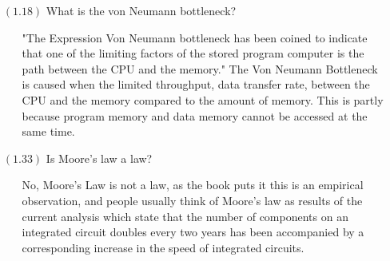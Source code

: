 \documentclass[letterpaper,12pt,titlepage]{article}
\begin{document}
\begin{enumerate}
\item[$(1.18)$]What is the von Neumann bottleneck?
  \begin{enumerate}
  \item[] "The Expression Von Neumann bottleneck has been coined to indicate that one of the limiting factors of the stored program computer is the path between the CPU and the memory." \cite{Clements} The Von Neumann Bottleneck is caused when the limited throughput, data transfer rate, between the CPU and the memory compared to the amount of memory. This is partly because program memory and data memory cannot be accessed at the same time. 
  \end{enumerate}
\item[$(1.33)$]Is Moore's law a law?
  \begin{enumerate}
  \item[] No, Moore's Law is not a law, as the book puts it this is an empirical observation, and people usually think of Moore's law as results of the current analysis which state that the number of components on an integrated circuit doubles every two years has been accompanied by a corresponding increase in the speed of integrated circuits. 
  \end{enumerate}

\end{enumerate}



\end{document}

